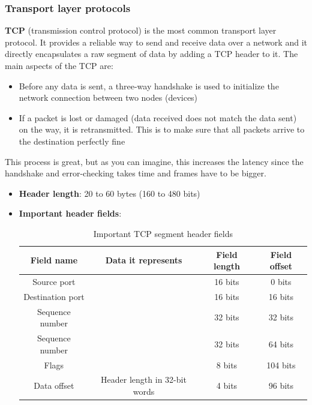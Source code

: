 \documentclass[a4paper]{article}
\begin{document}
  \vspace{1cm}


  \subsubsection{Transport layer protocols}

  \textbf{TCP} (transmission control protocol) is the most common transport 
  layer protocol. It provides a reliable way to send and receive data over a 
  network and it directly encapsulates a raw segment of data by adding 
  a TCP header to it. 
  The main aspects of the TCP are:
  \begin{itemize}
    \item Before any data is sent, a three-way handshake is used 
      to initialize the network connection between two nodes (devices)
    \item If a packet is lost or damaged (data received does not match the 
      data sent) on the way, it is retransmitted. This is to make sure
      that all packets arrive to the destination perfectly fine
  \end{itemize}
  This process is great, but as you can imagine, this increases the latency 
  since the handshake and error-checking takes time and frames have to be 
  bigger.

  \begin{itemize}
    \item \textbf{Header length}: 20 to 60 bytes (160 to 480 bits)
    \item \textbf{Important header fields}:
      \begin{table}[h]
        \centering
        \begin{tabular}{|c|c|c|c|}
          \hline
          Field name & Data it represents & Field length & Field offset \\
          \hline
          \hline
          Source port & & 16 bits & 0 bits \\
          \hline
          Destination port & & 16 bits & 16 bits \\
          \hline
          Sequence number & & 32 bits & 32 bits \\
          \hline
          Sequence number & & 32 bits & 64 bits \\
          \hline
          Flags & & 8 bits & 104 bits \\
          \hline
          Data offset & Header length in 32-bit words & 4 bits & 96 bits \\
          \hline
        \end{tabular}
        \caption{Important TCP segment header fields}
      \end{table}
  \end{itemize}
\end{document}
